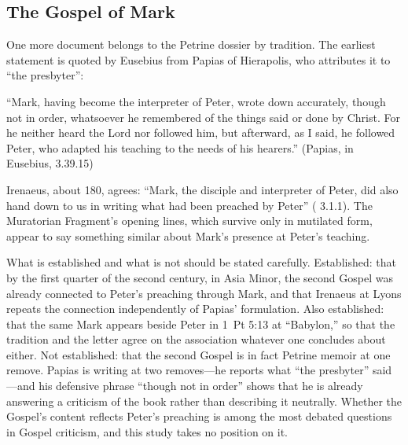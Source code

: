 \subsection{The Gospel of Mark}

One more document belongs to the Petrine dossier by tradition. The earliest
statement is quoted by Eusebius from Papias of Hierapolis, who attributes it
to ``the presbyter'':

\begin{studyframe}\small
``Mark, having become the interpreter of Peter, wrote down accurately,
though not in order, whatsoever he remembered of the things said or done by
Christ. For he neither heard the Lord nor followed him, but afterward, as I
said, he followed Peter, who adapted his teaching to the needs of his
hearers.'' (Papias, in Eusebius,  3.39.15)
\end{studyframe}

Irenaeus, about 180, agrees: ``Mark, the disciple and interpreter of Peter,
did also hand down to us in writing what had been preached by Peter''
( 3.1.1). The Muratorian Fragment's opening lines,
which survive only in mutilated form, appear to say something similar about
Mark's presence at Peter's teaching.

What is established and what is not should be stated carefully. Established:
that by the first quarter of the second century, in Asia Minor, the second
Gospel was already connected to Peter's preaching through Mark, and that
Irenaeus at Lyons repeats the connection independently of Papias'
formulation. Also established: that the same Mark appears beside Peter in
1~Pt 5:13 at ``Babylon,'' so that the tradition and the letter agree on the
association whatever one concludes about either. Not established: that the
second Gospel is in fact Petrine memoir at one remove. Papias is writing at
two removes---he reports what ``the presbyter'' said---and his defensive
phrase ``though not in order'' shows that he is already answering a criticism
of the book rather than describing it neutrally. Whether the Gospel's content
reflects Peter's preaching is among the most debated questions in Gospel
criticism, and this study takes no position on it.

